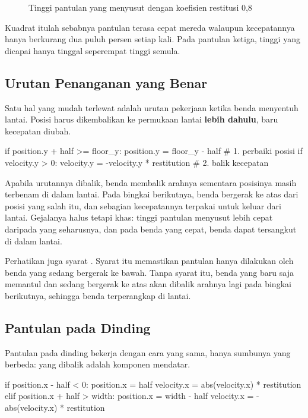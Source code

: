 \begin{figure}[htbp]
\centering

\caption{Tinggi pantulan yang menyusut dengan koefisien restitusi 0,8}
\label{fig:pantulan}
\end{figure}

Kuadrat itulah sebabnya pantulan terasa cepat mereda walaupun kecepatannya
hanya berkurang dua puluh persen setiap kali. Pada pantulan ketiga, tinggi yang
dicapai hanya tinggal seperempat tinggi semula.

\subsection{Urutan Penanganan yang Benar}

Satu hal yang mudah terlewat adalah urutan pekerjaan ketika benda menyentuh
lantai. Posisi harus dikembalikan ke permukaan lantai \textbf{lebih dahulu},
baru kecepatan diubah.

\begin{kodekeluaran}
if position.y + half >= floor_y:
    position.y = floor_y - half                   # 1. perbaiki posisi
    if velocity.y > 0:
        velocity.y = -velocity.y * restitution    # 2. balik kecepatan
\end{kodekeluaran}

Apabila urutannya dibalik, benda membalik arahnya sementara posisinya masih
terbenam di dalam lantai. Pada bingkai berikutnya, benda bergerak ke atas dari
posisi yang salah itu, dan sebagian kecepatannya terpakai untuk keluar dari
lantai. Gejalanya halus tetapi khas: tinggi pantulan menyusut lebih cepat
daripada yang seharusnya, dan pada benda yang cepat, benda dapat tersangkut di
dalam lantai.

Perhatikan juga syarat . Syarat itu memastikan
pantulan hanya dilakukan oleh benda yang sedang bergerak ke bawah. Tanpa syarat
itu, benda yang baru saja memantul dan sedang bergerak ke atas akan dibalik
arahnya lagi pada bingkai berikutnya, sehingga benda terperangkap di lantai.

\subsection{Pantulan pada Dinding}

Pantulan pada dinding bekerja dengan cara yang sama, hanya sumbunya yang
berbeda: yang dibalik adalah komponen mendatar.

\begin{kodekeluaran}
if position.x - half < 0:
    position.x = half
    velocity.x = abs(velocity.x) * restitution
elif position.x + half > width:
    position.x = width - half
    velocity.x = -abs(velocity.x) * restitution
\end{kodekeluaran}


